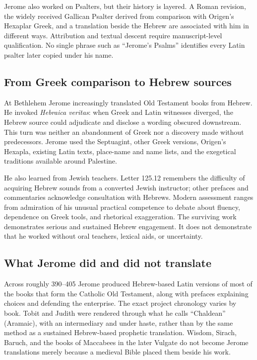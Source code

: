 Jerome also worked on Psalters, but their history is layered. A Roman revision,
the widely received Gallican Psalter derived from comparison with Origen's
Hexaplar Greek, and a translation beside the Hebrew are associated with him in
different ways. Attribution and textual descent require manuscript-level
qualification. No single phrase such as ``Jerome's Psalms'' identifies every
Latin psalter later copied under his name.

\subsection{From Greek comparison to Hebrew sources}

At Bethlehem Jerome increasingly translated Old Testament books from Hebrew.
He invoked \emph{Hebraica veritas}: when Greek and Latin witnesses diverged,
the Hebrew source could adjudicate and disclose a wording obscured downstream.
This turn was neither an abandonment of Greek nor a discovery made without
predecessors. Jerome used the Septuagint, other Greek versions, Origen's
Hexapla, existing Latin texts, place-name and name lists, and the exegetical
traditions available around Palestine.

He also learned from Jewish teachers. Letter 125.12 remembers the difficulty of
acquiring Hebrew sounds from a converted Jewish instructor; other prefaces and
commentaries acknowledge consultation with Hebrews. Modern assessment ranges
from admiration of his unusual practical competence to debate about fluency,
dependence on Greek tools, and rhetorical exaggeration. The surviving work
demonstrates serious and sustained Hebrew engagement. It does not demonstrate
that he worked without oral teachers, lexical aids, or uncertainty.

\subsection{What Jerome did and did not translate}

Across roughly 390--405 Jerome produced Hebrew-based Latin versions of most of
the books that form the Catholic Old Testament, along with prefaces explaining
choices and defending the enterprise. The exact project chronology varies by
book. Tobit and Judith were rendered through what he calls ``Chaldean''
(Aramaic), with an intermediary and under haste, rather than by the same method
as a sustained Hebrew-based prophetic translation. Wisdom, Sirach, Baruch, and
the books of Maccabees in the later Vulgate do not become Jerome translations
merely because a medieval Bible placed them beside his work.

